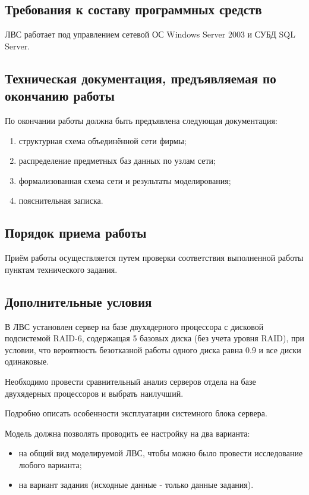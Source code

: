 \documentclass[russian,utf8,emptystyle]{eskdtext}
\begin{document}
\subsection{Требования к составу программных средств}
ЛВС работает под управлением сетевой ОС Windows Server 2003 и СУБД SQL Server. 

\subsection{Техническая документация, предъявляемая по окончанию работы}
По окончании работы должна быть предъявлена следующая документация:
\begin{enumerate}[label=-]
\item структурная схема объединённой сети фирмы;
\item распределение предметных баз данных по узлам сети;
\item формализованная схема сети и результаты моделирования;
\item пояснительная записка.
\end{enumerate}

\subsection{Порядок приема работы}
Приём работы осуществляется путем проверки соответствия выполненной работы пунктам
технического задания.

\subsection{Дополнительные условия}
В ЛВС установлен сервер на базе двухядерного процессора с дисковой подсистемой RAID-6, содержащая 5 базовых диска (без учета уровня RAID), при условии, что вероятность безотказной работы одного диска равна 0.9 и все диски одинаковые.

Необходимо провести сравнительный анализ серверов отдела на базе двухядерных процессоров  и выбрать наилучший.

Подробно описать особенности эксплуатации  системного блока сервера.

Модель должна позволять проводить ее настройку на два варианта:
\begin{itemize}
\item на общий вид моделируемой ЛВС, чтобы можно было провести исследование любого варианта;
\item на вариант задания (исходные данные - только данные задания). 
\end{itemize}
\end{document}

